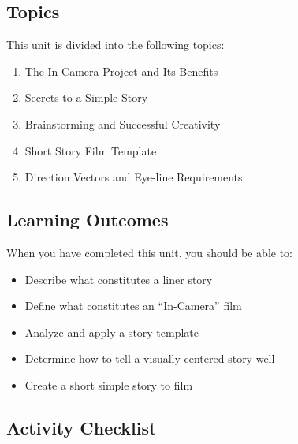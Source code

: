 \documentclass[
]{book}
\providecommand{\tightlist}{%
  \setlength{\itemsep}{0pt}\setlength{\parskip}{0pt}}
\begin{document}
\hypertarget{topics-5}{%
\subsection*{Topics}\label{topics-5}}

This unit is divided into the following topics:

\begin{enumerate}
\def\labelenumi{\arabic{enumi}.}
\tightlist
\item
  The In-Camera Project and Its Benefits\\
\item
  Secrets to a Simple Story\\
\item
  Brainstorming and Successful Creativity\\
\item
  Short Story Film Template\\
\item
  Direction Vectors and Eye-line Requirements
\end{enumerate}

\hypertarget{learning-outcomes-5}{%
\subsection*{Learning Outcomes}\label{learning-outcomes-5}}

When you have completed this unit, you should be able to:

\begin{itemize}
\tightlist
\item
  Describe what constitutes a liner story\\
\item
  Define what constitutes an ``In-Camera'' film\\
\item
  Analyze and apply a story template\\
\item
  Determine how to tell a visually-centered story well\\
\item
  Create a short simple story to film
\end{itemize}

\hypertarget{activity-checklist-5}{%
\subsection*{Activity Checklist}\label{activity-checklist-5}}
\end{document}
